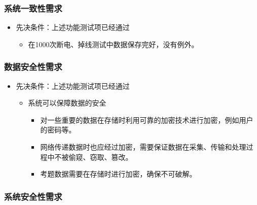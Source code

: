 \documentclass[hyperref, a4paper]{ctexart}
\providecommand{\tightlist}{%
  \setlength{\itemsep}{0pt}\setlength{\parskip}{0pt}}
\begin{document}
\hypertarget{ux7cfbux7edfux4e00ux81f4ux6027ux9700ux6c42}{%
\subsubsection{系统一致性需求}\label{ux7cfbux7edfux4e00ux81f4ux6027ux9700ux6c42}}

\begin{itemize}
\tightlist
\item
  先决条件：上述功能测试项已经通过

  \begin{itemize}
  \tightlist
  \item
    在1000次断电、掉线测试中数据保存完好，没有例外。
  \end{itemize}
\end{itemize}

\hypertarget{ux6570ux636eux5b89ux5168ux6027ux9700ux6c42}{%
\subsubsection{数据安全性需求}\label{ux6570ux636eux5b89ux5168ux6027ux9700ux6c42}}

\begin{itemize}
\tightlist
\item
  先决条件：上述功能测试项已经通过

  \begin{itemize}
  \tightlist
  \item
    系统可以保障数据的安全

    \begin{itemize}
    \tightlist
    \item
      对一些重要的数据在存储时利用可靠的加密技术进行加密，例如用户的密码等。
    \item
      网络传递数据时也应经过加密，需要保证数据在采集、传输和处理过程中不被偷窥、窃取、篡改。
    \item
      考题数据需要在存储时进行加密，确保不可破解。
    \end{itemize}
  \end{itemize}
\end{itemize}

\hypertarget{ux7cfbux7edfux5b89ux5168ux6027ux9700ux6c42}{%
\subsubsection{系统安全性需求}\label{ux7cfbux7edfux5b89ux5168ux6027ux9700ux6c42}}
\end{document}
